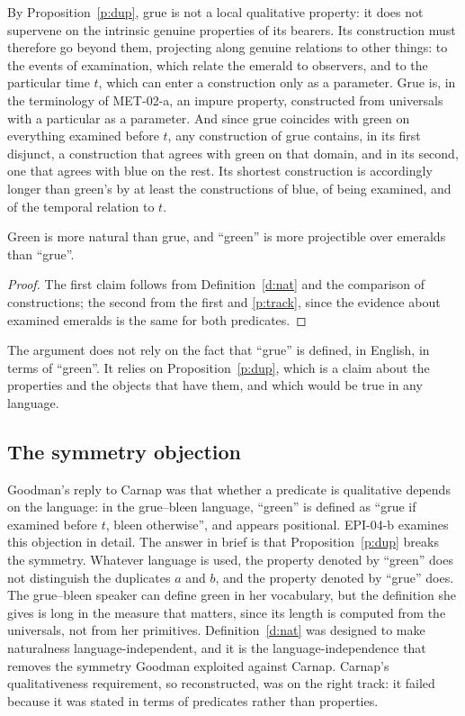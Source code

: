 \documentclass{situationist-preprint}
\begin{document}
By Proposition~\ref{p:dup}, grue is not a local qualitative property: it does not supervene on the intrinsic genuine properties of its bearers. Its construction must therefore go beyond them, projecting along genuine relations to other things: to the events of examination, which relate the emerald to observers, and to the particular time $t$, which can enter a construction only as a parameter. Grue is, in the terminology of MET-02-a, an impure property, constructed from universals with a particular as a parameter. And since grue coincides with green on everything examined before $t$, any construction of grue contains, in its first disjunct, a construction that agrees with green on that domain, and in its second, one that agrees with blue on the rest. Its shortest construction is accordingly longer than green's by at least the constructions of blue, of being examined, and of the temporal relation to $t$.

\begin{corollary}\label{c:green}
Green is more natural than grue, and \enquote{green} is more projectible over emeralds than \enquote{grue}.
\end{corollary}

\begin{proof}
The first claim follows from Definition~\ref{d:nat} and the comparison of constructions; the second from the first and \ref{p:track}, since the evidence about examined emeralds is the same for both predicates.
\end{proof}

The argument does not rely on the fact that \enquote{grue} is defined, in English, in terms of \enquote{green}. It relies on Proposition~\ref{p:dup}, which is a claim about the properties and the objects that have them, and which would be true in any language.

\subsection{The symmetry objection}

Goodman's reply to Carnap was that whether a predicate is qualitative depends on the language: in the grue--bleen language, \enquote{green} is defined as \enquote{grue if examined before $t$, bleen otherwise}, and appears positional. EPI-04-b examines this objection in detail. The answer in brief is that Proposition~\ref{p:dup} breaks the symmetry. Whatever language is used, the property denoted by \enquote{green} does not distinguish the duplicates $a$ and $b$, and the property denoted by \enquote{grue} does. The grue--bleen speaker can define green in her vocabulary, but the definition she gives is long in the measure that matters, since its length is computed from the universals, not from her primitives. Definition~\ref{d:nat} was designed to make naturalness language-independent, and it is the language-independence that removes the symmetry Goodman exploited against Carnap. Carnap's qualitativeness requirement, so reconstructed, was on the right track: it failed because it was stated in terms of predicates rather than properties.
\end{document}

